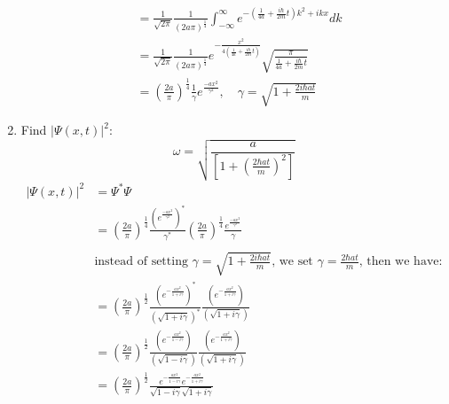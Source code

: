 \documentclass{article}
\begin{document}
\begin{enumerate}[label=(\alph*)]
\begin{align*}
		                & = \frac{1}{\sqrt{2\pi}} \frac{1}{(2a\pi)^\frac{1}{4}} \int_{-\infty}^{\infty} e^{-\left(\frac{1}{4a} + \frac{i \hbar }{2m}t\right)k^2 + ikx} dk                             \\
		                & = \frac{1}{\sqrt{2\pi}} \frac{1}{(2a\pi)^\frac{1}{4}} e^{-\frac{x^2}{4\left(\frac{1}{4a}+ \frac{i \hbar}{2m }t\right)}} \sqrt{\frac{\pi}{\frac{1}{4a}+ \frac{i\hbar}{2m}t}} \\
		                & = \left(\frac{2a}{\pi}\right)^\frac{1}{4} \frac{1}{\gamma}e^{\frac{-ax^2}{\gamma^2}}, \quad \gamma = \sqrt{1 + \frac{2 i \hbar a t}{m}}
	      \end{align*}
	\item Find \(|\Psi(x,t)|^2\):
	      \[\omega = \sqrt{\frac{a}{\left[1+ \left(\frac{2 \hbar a t}{m}\right)^2\right]}}\]
	      \begin{align*}
		      |\Psi(x,t)|^2 & = \Psi^* \Psi                                                                                                                                                                                                       \\
		                    & = \left(\frac{2a}{\pi}\right)^\frac{1}{4} \frac{\left(e^{\frac{-ax^2}{\gamma^2}}\right)^*}{\gamma^*} \left(\frac{2a}{\pi}\right)^\frac{1}{4} \frac{e^{\frac{-ax^2}{\gamma^2}}}{\gamma}                              \\
		      \\
		                    & \text{instead of setting } \gamma = \sqrt{1 + \frac{2 i \hbar a t}{m}} \text{, we set } \gamma = \frac{2 \hbar a t}{m} \text{, then we have:}                                                                       \\
		                    & = \left(\frac{2a}{\pi}\right)^\frac{1}{2} \frac{\left(e^{-\frac{ax^2}{1+i \gamma}}\right)^*}{\left(\sqrt{1 + i \gamma}\right)^*} \frac{\left(e^{-\frac{ax^2}{1+i \gamma}}\right)}{\left(\sqrt{1 + i \gamma}\right)} \\
		                    & = \left(\frac{2a}{\pi}\right)^\frac{1}{2} \frac{\left(e^{-\frac{ax^2}{1-i \gamma}}\right)}{\left(\sqrt{1 - i \gamma}\right)} \frac{\left(e^{-\frac{ax^2}{1+i \gamma}}\right)}{\left(\sqrt{1 + i \gamma}\right)}     \\
		                    & = \left(\frac{2a}{\pi}\right)^\frac{1}{2} \frac{e^{-\frac{ax^2}{1-i \gamma}} e^{-\frac{ax^2}{1+i \gamma}}}{\sqrt{1 - i \gamma} \sqrt{1 + i \gamma}}                                                                 \\

\end{align*}
\end{enumerate}
\end{document}
